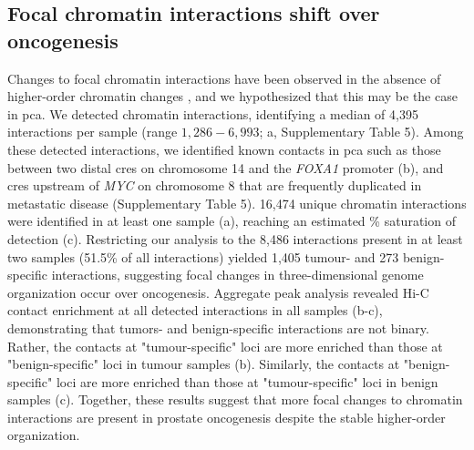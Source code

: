 \subsection{Focal chromatin interactions shift over oncogenesis}

Changes to focal chromatin interactions have been observed in the absence of higher-order chromatin changes \cite{takayamaTransitionQuiescentActivated2021,johnstoneLargeScaleTopologicalChanges2020}, and we hypothesized that this may be the case in \gls{pca}.
We detected chromatin interactions, identifying a median of 4,395 interactions per sample (range $1,286 - 6,993$; a, Supplementary Table 5).
Among these detected interactions, we identified known contacts in \gls{pca} such as those between two distal \glspl{cre} on chromosome 14 and the \emph{FOXA1} promoter \cite{zhouNoncodingMutationsTarget2020} (b), and \glspl{cre} upstream of \emph{MYC} on chromosome 8 that are frequently duplicated in metastatic disease \cite{quigleyGenomicHallmarksStructural2018} (Supplementary Table 5).
16,474 unique chromatin interactions were identified in at least one sample (a), reaching an estimated \% saturation of detection (c).
Restricting our analysis to the 8,486 interactions present in at least two samples (51.5\% of all interactions) yielded 1,405 tumour- and 273 benign-specific interactions, suggesting focal changes in three-dimensional genome organization occur over oncogenesis.
Aggregate peak analysis revealed Hi-C contact enrichment at all detected interactions in all samples (b-c), demonstrating that tumors- and benign-specific interactions are not binary.
Rather, the contacts at "tumour-specific" loci are more enriched than those at "benign-specific" loci in tumour samples (b).
Similarly, the contacts at "benign-specific" loci are more enriched than those at "tumour-specific" loci in benign samples (c).
Together, these results suggest that more focal changes to chromatin interactions are present in prostate oncogenesis despite the stable higher-order organization.


